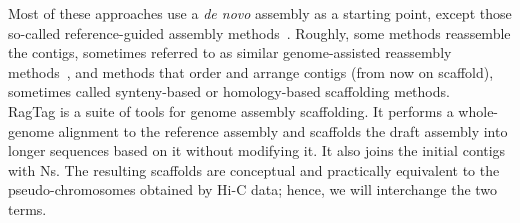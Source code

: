 Most of these approaches use a \textit{de novo} assembly as a starting point, except those so-called reference-guided assembly methods~\cite{ReferenceguidedAssemblyFour,lischerReferenceguidedNovoAssembly2017}. Roughly, some methods reassemble the contigs, sometimes referred to as similar genome-assisted reassembly methods~\cite{baoAlignGraphAlgorithmSecondary2014,huangAlignGraph2SimilarGenomeassisted2021,baoReMILOReferenceAssisted2018}, and methods that order and arrange contigs (from now on scaffold), sometimes called synteny-based or homology-based scaffolding methods.~\cite{kimReferenceassistedChromosomeAssembly2013,kolmogorovRagout2022,alongeAutomatedAssemblyScaffolding2022}\\

RagTag is a suite of tools for genome assembly scaffolding. It performs a whole-genome alignment to the reference assembly and scaffolds the draft assembly into longer sequences based on it without modifying it. It also joins the initial contigs with Ns. The resulting scaffolds are conceptual and practically equivalent to the pseudo-chromosomes obtained by Hi-C data; hence, we will interchange the two terms. \\